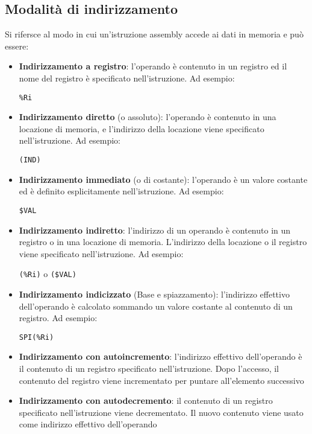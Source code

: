 \documentclass[a4paper]{article}
\theoremstyle{break}
\theoremstyle{break}
\theoremstyle{break}
\theoremstyle{break}
\begin{document}
\subsection{Modalità di indirizzamento}
Si rifersce al modo in cui un'istruzione assembly accede ai dati in memoria e può essere:
\begin{itemize}
	\item \textbf{Indirizzamento a registro}: l'operando è contenuto in un registro ed
	      il nome del registro è specificato nell'istruzione. Ad esempio:
	      \begin{center}
		      \texttt{\%Ri}
	      \end{center}

	\item \textbf{Indirizzamento diretto} (o assoluto): l'operando è contenuto in una
	      locazione di memoria, e l'indirizzo della locazione viene specificato
	      nell'istruzione. Ad esempio:
	      \begin{center}
		      \texttt{(IND)}
	      \end{center}

	\item \textbf{Indirizzamento immediato} (o di costante): l'operando è un valore
	      costante ed è definito esplicitamente nell'istruzione. Ad esempio:
	      \begin{center}
		      \texttt{\$VAL}
	      \end{center}

	\item \textbf{Indirizzamento indiretto}: l'indirizzo di un operando è contenuto in
	      un registro o in una locazione di memoria. L'indirizzo della locazione o
	      il registro viene specificato nell'istruzione. Ad esempio:
	      \begin{center}
		      \texttt{(\%Ri)} \quad o \quad \texttt{(\$VAL)}
	      \end{center}

	\item \textbf{Indirizzamento indicizzato} (Base e spiazzamento): l'indirizzo
	      effettivo dell'operando è calcolato sommando un valore costante al
	      contenuto di un registro. Ad esempio:
	      \begin{center}
		      \texttt{SPI(\%Ri)}
	      \end{center}

	\item \textbf{Indirizzamento con autoincremento}: l'indirizzo effettivo
	      dell'operando è il contenuto di un registro specificato nell'istruzione.
	      Dopo l'accesso, il contenuto del registro viene incrementato per
	      puntare all'elemento successivo

	\item \textbf{Indirizzamento con autodecremento}: il contenuto di un registro
	      specificato nell'istruzione viene decrementato. Il nuovo contenuto
	      viene usato come indirizzo effettivo dell'operando

\end{itemize}
\end{document}
